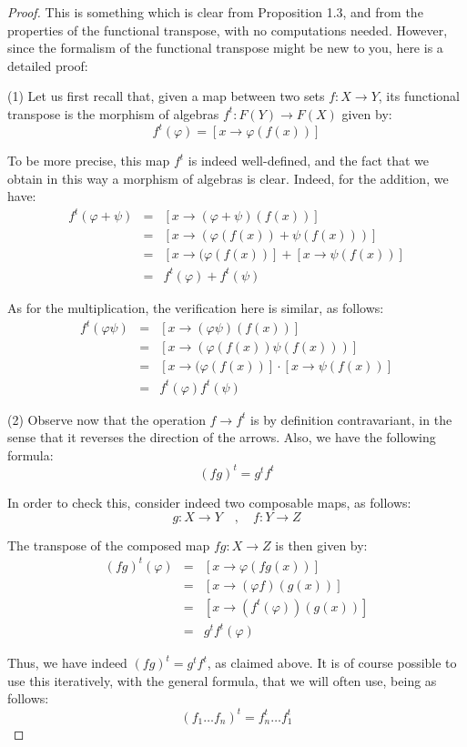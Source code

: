 \documentclass[12pt]{amsbook}
\begin{document}
\begin{proof}
This is something which is clear from Proposition 1.3, and from the properties of the functional transpose, with no computations needed. However, since the formalism of the functional transpose might be new to you, here is a detailed proof:

\medskip

(1) Let us first recall that, given a map between two sets $f:X\to Y$, its functional transpose is the morphism of algebras $f^t:F(Y)\to F(X)$ given by:
$$f^t(\varphi)=[x\to\varphi(f(x))]$$

To be more precise, this map $f^t$ is indeed well-defined, and the fact that we obtain in this way a morphism of algebras is clear. Indeed, for the addition, we have:
\begin{eqnarray*}
f^t(\varphi+\psi)
&=&[x\to(\varphi+\psi)(f(x))]\\
&=&[x\to(\varphi(f(x))+\psi(f(x)))]\\
&=&[x\to(\varphi(f(x))]+[x\to\psi(f(x))]\\
&=&f^t(\varphi)+f^t(\psi)
\end{eqnarray*}

As for the multiplication, the verification here is similar, as follows:
\begin{eqnarray*}
f^t(\varphi\psi)
&=&[x\to(\varphi\psi)(f(x))]\\
&=&[x\to(\varphi(f(x))\psi(f(x)))]\\
&=&[x\to(\varphi(f(x))]\cdot [x\to\psi(f(x))]\\
&=&f^t(\varphi)f^t(\psi)
\end{eqnarray*}

(2) Observe now that the operation $f\to f^t$ is by definition contravariant, in the sense that it reverses the direction of the arrows. Also, we have the following formula:
$$(fg)^t=g^tf^t$$

In order to check this, consider indeed two composable maps, as follows:
$$g:X\to Y\quad,\quad f:Y\to Z$$

The transpose of the composed map $fg:X\to Z$ is then given by:
\begin{eqnarray*}
(fg)^t(\varphi)
&=&[x\to\varphi(fg(x))]\\
&=&[x\to(\varphi f)(g(x))]\\
&=&[x\to(f^t(\varphi))(g(x))]\\
&=&g^tf^t(\varphi)
\end{eqnarray*}

Thus, we have indeed $(fg)^t=g^tf^t$, as claimed above. It is of course possible to use this iteratively, with the general formula, that we will often use, being as follows:
$$(f_1\ldots f_n)^t=f_n^t\ldots f_1^t$$


\end{proof}
\end{document}
